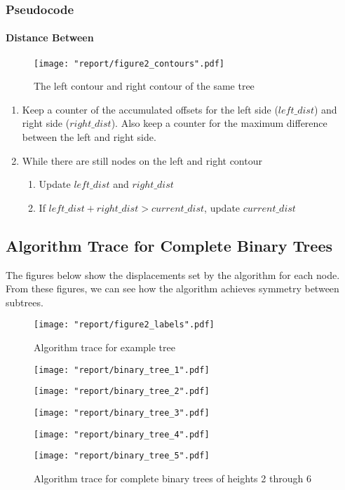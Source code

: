 \documentclass[11pt]{article}
\begin{document}
\subsubsection*{Pseudocode}

\paragraph{Distance Between}

\begin{figure}[H]
    \texttt{[image: "report/figure2\_contours".pdf]}
    \caption{The left contour and right contour of the same tree}
\end{figure}

\begin{enumerate}
    \item Keep a counter of the accumulated offsets for the left side ($left\_dist$) and right side ($right\_dist$). Also keep a counter for the maximum difference between the left and right side.
    \item While there are still nodes on the left and right contour
    \begin{enumerate}
        \item Update $left\_dist$ and $right\_dist$
        \item If $left\_dist + right\_dist > current\_dist$, update $current\_dist$
    \end{enumerate}
\end{enumerate}

\subsection*{Algorithm Trace for Complete Binary Trees}
The figures below show the displacements set by the algorithm for each node. From these figures, we can see how the algorithm achieves symmetry between subtrees.

\begin{figure}[H]
    \centering
    \texttt{[image: "report/figure2\_labels".pdf]}
    \caption{Algorithm trace for example tree}
\end{figure}

\begin{figure}[H]   
    \texttt{[image: "report/binary\_tree\_1".pdf]}
    \linebreak
    
    \texttt{[image: "report/binary\_tree\_2".pdf]}
    \linebreak
    
    \texttt{[image: "report/binary\_tree\_3".pdf]}
    \linebreak
    
    \texttt{[image: "report/binary\_tree\_4".pdf]}
    \linebreak
    
    \texttt{[image: "report/binary\_tree\_5".pdf]}
    \linebreak
    
    \caption{Algorithm trace for complete binary trees of heights 2 through 6}
\end{figure}
\end{document}
